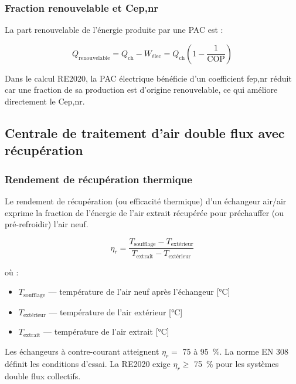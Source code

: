 \subsubsection{Fraction renouvelable et Cep,nr}

La part renouvelable de l'énergie produite par une PAC est :

\begin{equation}
  Q_{\text{renouvelable}} = Q_{\text{ch}} - W_{\text{élec}} = Q_{\text{ch}} \left(1 - \frac{1}{\text{COP}}\right)
\end{equation}

Dans le calcul RE2020, la PAC électrique bénéficie d'un coefficient fep,nr réduit car une fraction de sa production est d'origine renouvelable, ce qui améliore directement le Cep,nr.

\subsection{Centrale de traitement d'air double flux avec récupération}

\subsubsection{Rendement de récupération thermique}

\begin{definition}[title=Rendement de récupération thermique $\eta_r$]
Le rendement de récupération (ou efficacité thermique) d'un échangeur air/air exprime la fraction de l'énergie de l'air extrait récupérée pour préchauffer (ou pré-refroidir) l'air neuf.
\end{definition}

\begin{equation}
  \eta_r = \frac{T_{\text{soufflage}} - T_{\text{extérieur}}}{T_{\text{extrait}} - T_{\text{extérieur}}}
  \label{eq:eta_recup}
\end{equation}

où :
\begin{itemize}
  \item $T_{\text{soufflage}}$ — température de l'air neuf après l'échangeur [\si{\degreeCelsius}]
  \item $T_{\text{extérieur}}$ — température de l'air extérieur [\si{\degreeCelsius}]
  \item $T_{\text{extrait}}$ — température de l'air extrait [\si{\degreeCelsius}]
\end{itemize}

Les échangeurs à contre-courant atteignent $\eta_r = $ 75 à 95~\%. La norme EN 308 définit les conditions d'essai. La RE2020 exige $\eta_r \geq $ 75~\% pour les systèmes double flux collectifs.

